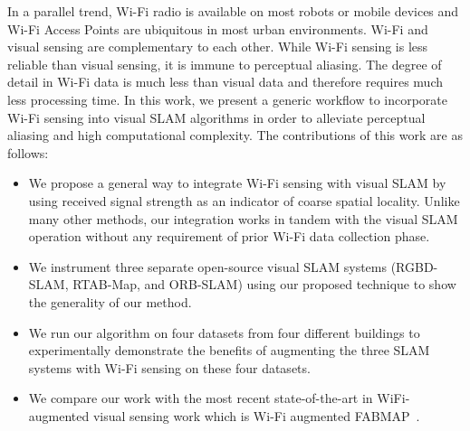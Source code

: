 In a parallel trend, Wi-Fi radio is available on most robots or mobile devices and Wi-Fi Access Points are ubiquitous in most urban environments.
Wi-Fi and visual sensing are complementary to each other. While Wi-Fi sensing is less reliable than visual sensing, it is immune to perceptual aliasing.
The degree of detail in Wi-Fi data is much less than visual data and therefore requires much less processing time. 
In this work, we present a generic workflow to incorporate Wi-Fi sensing into visual SLAM algorithms in order to alleviate perceptual aliasing and high computational complexity. The contributions of this work are as follows:
\begin{itemize}
\item We propose a general way to integrate Wi-Fi sensing with visual SLAM by using received signal strength as an indicator of coarse spatial locality. Unlike many other methods, our integration works in tandem with the visual SLAM operation without any requirement of prior Wi-Fi data collection phase. 
\item We instrument three separate open-source visual SLAM systems (RGBD-SLAM, RTAB-Map, and ORB-SLAM) using our proposed technique to show the generality of our method.
\item We run our algorithm on four datasets from four different buildings to experimentally demonstrate the benefits of augmenting the three SLAM systems with Wi-Fi sensing on these four datasets.
\item We compare our work with the most recent state-of-the-art in WiFi-augmented visual sensing work which is Wi-Fi augmented FABMAP~\cite{visual_wifi_2}.
\end{itemize}


